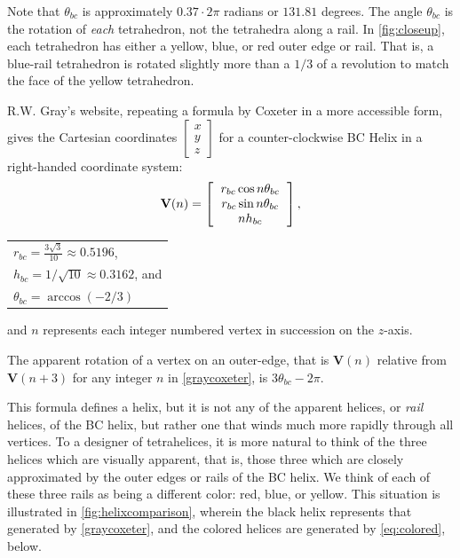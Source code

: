 \documentclass[twocolumn,10pt]{asme2ej}
\renewcommand{\vec}[1]{\mathbf{#1}}
\begin{document}
Note that $\theta_{bc}$ is approximately $0.37 \cdot 2 \pi$ radians or  $131.81$ degrees.
The angle $\theta_{bc}$ is the rotation of \emph{each} tetrahedron, not the tetrahedra along a rail.  In \cref{fig:closeup},
each tetrahedron has either a yellow, blue, or red outer edge or rail.
That is, a blue-rail tetrahedron is rotated slightly more than a $1/3$ of a revolution to match the face of the yellow tetrahedron.

R.W. Gray's website\cite{graytetrahelix}, repeating a formula by Coxeter\cite{coxeter1985simplicial} in a more accessible form, gives the Cartesian coordinates $\begin{bmatrix}
           x \\
           y \\
           z
         \end{bmatrix}$
for a counter-clockwise BC Helix in a right-handed coordinate system:
\begin{equation}
  \label{graycoxeter}
\vec{V}(n) =
\left [
  \begin{tabular}{c}
   $ r_{bc} \cos{n \theta_{bc}} $\\
   $ r_{bc} \sin{n \theta_{bc}} $\\
   $ n h_{bc}  $
  \end{tabular}
  \right ],
\end{equation}
  \begin{tabular}{l}
 $ r_{bc} = \frac{3\sqrt{3}}{10} \approx 0.5196 $,\\
 $ h_{bc} = 1/\sqrt{10} \approx 0.3162 $, and \\
 $ \theta_{bc} = \arccos(-2/3) $  \text{,}\\
  \end{tabular}      

and $n$ represents each integer numbered vertex in succession on the $z$-axis.

The apparent rotation of a vertex on an outer-edge, that is $\vec{V}(n)$ relative from $\vec{V}(n+3)$
for any integer $n$
in \cref{graycoxeter}, is $3 \theta_{bc} - 2\pi$.

This formula defines a helix, but it is not any of the apparent helices, or \emph{rail} helices, of the
BC helix, but rather one that winds much more rapidly through all
vertices. To a designer of tetrahelices, it is more natural to think of
the three helices which are visually apparent, that is, those three
which are closely approximated by the outer edges or rails of
the BC helix. We think of each of these three rails as being a different color: red, blue, or yellow.
This situation is illustrated in \cref{fig:helixcomparison}, wherein the black helix represents that
generated by \cref{graycoxeter},
and the colored helices are generated by \cref{eq:colored}, below. 
\end{document}
